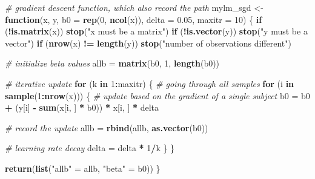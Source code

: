 \documentclass[
]{book}
\newenvironment{Shaded}{\begin{snugshade}}{\end{snugshade}}
\newcommand{\AttributeTok}[1]{\textcolor[rgb]{0.13,0.29,0.53}{#1}}
\newcommand{\CommentTok}[1]{\textcolor[rgb]{0.56,0.35,0.01}{\textit{#1}}}
\newcommand{\ControlFlowTok}[1]{\textcolor[rgb]{0.13,0.29,0.53}{\textbf{#1}}}
\newcommand{\DecValTok}[1]{\textcolor[rgb]{0.00,0.00,0.81}{#1}}
\newcommand{\FloatTok}[1]{\textcolor[rgb]{0.00,0.00,0.81}{#1}}
\newcommand{\FunctionTok}[1]{\textcolor[rgb]{0.13,0.29,0.53}{\textbf{#1}}}
\newcommand{\NormalTok}[1]{#1}
\newcommand{\OtherTok}[1]{\textcolor[rgb]{0.56,0.35,0.01}{#1}}
\newcommand{\SpecialCharTok}[1]{\textcolor[rgb]{0.81,0.36,0.00}{\textbf{#1}}}
\newcommand{\StringTok}[1]{\textcolor[rgb]{0.31,0.60,0.02}{#1}}
\theoremstyle{definition}
\theoremstyle{definition}
\theoremstyle{definition}
\theoremstyle{definition}
\theoremstyle{remark}
\begin{document}
\begin{Shaded}
\begin{Highlighting}[]
  \CommentTok{\# gradient descent function, which also record the path}
\NormalTok{  mylm\_sgd }\OtherTok{\textless{}{-}} \ControlFlowTok{function}\NormalTok{(x, y, }\AttributeTok{b0 =} \FunctionTok{rep}\NormalTok{(}\DecValTok{0}\NormalTok{, }\FunctionTok{ncol}\NormalTok{(x)), }\AttributeTok{delta =} \FloatTok{0.05}\NormalTok{, }\AttributeTok{maxitr =} \DecValTok{10}\NormalTok{)}
\NormalTok{  \{}
    \ControlFlowTok{if}\NormalTok{ (}\SpecialCharTok{!}\FunctionTok{is.matrix}\NormalTok{(x)) }\FunctionTok{stop}\NormalTok{(}\StringTok{"x must be a matrix"}\NormalTok{)}
    \ControlFlowTok{if}\NormalTok{ (}\SpecialCharTok{!}\FunctionTok{is.vector}\NormalTok{(y)) }\FunctionTok{stop}\NormalTok{(}\StringTok{"y must be a vector"}\NormalTok{)}
    \ControlFlowTok{if}\NormalTok{ (}\FunctionTok{nrow}\NormalTok{(x) }\SpecialCharTok{!=} \FunctionTok{length}\NormalTok{(y)) }\FunctionTok{stop}\NormalTok{(}\StringTok{"number of observations different"}\NormalTok{)}
    
    \CommentTok{\# initialize beta values}
\NormalTok{    allb }\OtherTok{=} \FunctionTok{matrix}\NormalTok{(b0, }\DecValTok{1}\NormalTok{, }\FunctionTok{length}\NormalTok{(b0))}
    
    \CommentTok{\# iterative update}
    \ControlFlowTok{for}\NormalTok{ (k }\ControlFlowTok{in} \DecValTok{1}\SpecialCharTok{:}\NormalTok{maxitr)}
\NormalTok{    \{}
      \CommentTok{\# going through all samples}
      \ControlFlowTok{for}\NormalTok{ (i }\ControlFlowTok{in} \FunctionTok{sample}\NormalTok{(}\DecValTok{1}\SpecialCharTok{:}\FunctionTok{nrow}\NormalTok{(x)))}
\NormalTok{      \{}
        \CommentTok{\# update based on the gradient of a single subject}
\NormalTok{        b0 }\OtherTok{=}\NormalTok{ b0 }\SpecialCharTok{+}\NormalTok{ (y[i] }\SpecialCharTok{{-}} \FunctionTok{sum}\NormalTok{(x[i, ] }\SpecialCharTok{*}\NormalTok{ b0)) }\SpecialCharTok{*}\NormalTok{ x[i, ] }\SpecialCharTok{*}\NormalTok{ delta}

        \CommentTok{\# record the update}
\NormalTok{        allb }\OtherTok{=} \FunctionTok{rbind}\NormalTok{(allb, }\FunctionTok{as.vector}\NormalTok{(b0))}
        
        \CommentTok{\# learning rate decay}
\NormalTok{        delta }\OtherTok{=}\NormalTok{ delta }\SpecialCharTok{*} \DecValTok{1}\SpecialCharTok{/}\NormalTok{k}
\NormalTok{      \}}
\NormalTok{    \}}
    
    \FunctionTok{return}\NormalTok{(}\FunctionTok{list}\NormalTok{(}\StringTok{"allb"} \OtherTok{=}\NormalTok{ allb, }\StringTok{"beta"} \OtherTok{=}\NormalTok{ b0))}
\NormalTok{  \}}


\end{Highlighting}
\end{Shaded}
\end{document}
